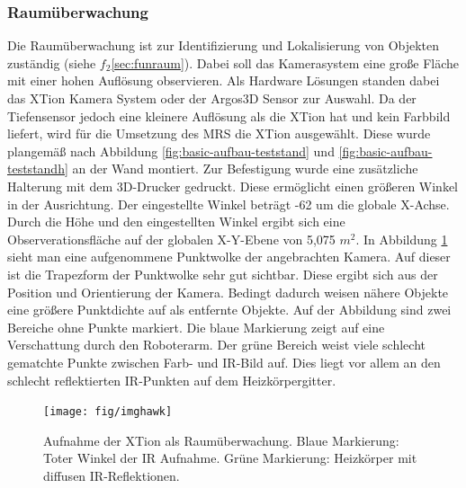 \subsubsection{Raumüberwachung}
Die Raumüberwachung ist zur Identifizierung und Lokalisierung von Objekten zuständig (siehe $f_2$\ref{sec:funraum}). Dabei soll das Kamerasystem eine große Fläche mit einer hohen Auflösung observieren. Als Hardware Lösungen standen dabei das XTion Kamera System oder der Argos3D Sensor zur Auswahl. Da der Tiefensensor jedoch eine kleinere Auflösung als die XTion hat und kein Farbbild liefert, wird für die Umsetzung des MRS die XTion ausgewählt. Diese wurde plangemäß nach Abbildung \ref{fig:basic-aufbau-teststand} und \ref{fig:basic-aufbau-teststandh} an der Wand montiert. Zur Befestigung wurde eine zusätzliche Halterung mit dem 3D-Drucker gedruckt. Diese ermöglicht einen größeren Winkel in der Ausrichtung. Der eingestellte Winkel beträgt -62 \textdegree um die globale X-Achse. Durch die Höhe und den eingestellten Winkel ergibt sich eine Observerationsfläche auf der globalen X-Y-Ebene von 5,075 $m^2$. In Abbildung \ref{fig:imghawk} sieht man eine aufgenommene Punktwolke der angebrachten Kamera. Auf dieser ist die Trapezform der Punktwolke sehr gut sichtbar. Diese ergibt sich aus der Position und Orientierung der Kamera. Bedingt dadurch weisen nähere Objekte eine größere Punktdichte auf als entfernte Objekte. Auf der Abbildung sind zwei Bereiche ohne Punkte markiert. Die blaue Markierung zeigt auf eine Verschattung durch den Roboterarm. Der grüne Bereich weist viele schlecht gematchte Punkte zwischen Farb- und IR-Bild auf. Dies liegt vor allem an den schlecht reflektierten IR-Punkten auf dem Heizkörpergitter.

\begin{figure}
	\centering
	\texttt{[image: fig/imghawk]}
	\caption[Raumüberwachung Aufnahme]{Aufnahme der XTion als Raumüberwachung. Blaue Markierung: Toter Winkel der IR Aufnahme. Grüne Markierung: Heizkörper mit diffusen IR-Reflektionen.}
	\label{fig:imghawk}
\end{figure}

